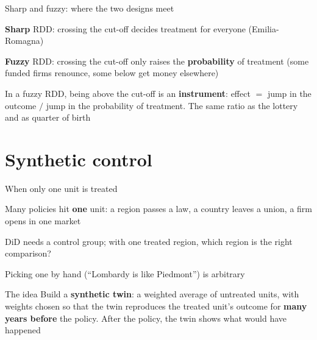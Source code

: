 \documentclass[aspectratio=169,xcolor=table]{beamer}
\begin{document}
\begin{frame}{Sharp and fuzzy: where the two designs meet}
\small
\bi
  \item \textbf{Sharp} RDD: crossing the cut-off decides treatment for everyone (Emilia-Romagna)
  \item \textbf{Fuzzy} RDD: crossing the cut-off only raises the \textbf{probability} of treatment (some funded firms renounce, some below get money elsewhere)
\ei
\begin{block}{}
In a fuzzy RDD, being above the cut-off is an \textbf{instrument}: effect $=$ jump in the outcome $/$ jump in the probability of treatment. The same ratio as the lottery and as quarter of birth
\end{block}
\end{frame}

\section{Synthetic control}

\begin{frame}{When only one unit is treated}
\small
\bi
  \item Many policies hit \textbf{one} unit: a region passes a law, a country leaves a union, a firm opens in one market
  \item DiD needs a control group; with one treated region, which region is the right comparison?
  \item Picking one by hand (``Lombardy is like Piedmont'') is arbitrary
\ei
\begin{block}{The idea}
Build a \textbf{synthetic twin}: a weighted average of untreated units, with weights chosen so that the twin reproduces the treated unit's outcome for \textbf{many years before} the policy. After the policy, the twin shows what would have happened
\end{block}
\end{frame}
\end{document}

